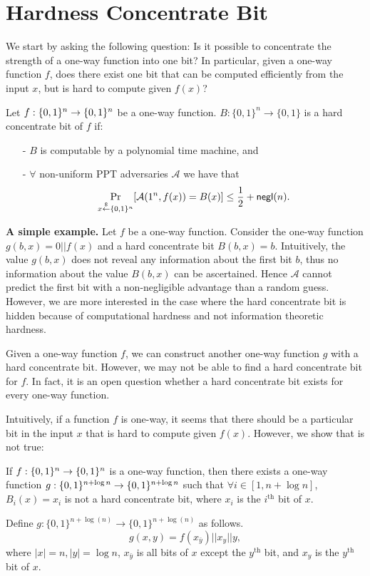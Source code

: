 \section{Hardness Concentrate Bit}
We start by asking the following question: Is it possible to concentrate the strength of a one-way function into one bit? In particular, given a one-way function $f$, does there exist one bit that can be computed efficiently from the input $x$, but is hard to compute given $f(x)$?
\begin{definition}
Let $f:\{0,1\}^{n} \rightarrow \{0,1\}^{n}$ be a one-way function.
$B:\{0,1\}^n \rightarrow \{0,1\}$ is a hard concentrate bit of $f$ if:
\begin{itemize}
\item[-] $B$ is computable by a polynomial time machine, and
\item[-] $\forall$ non-uniform PPT adversaries $\mathcal{A}$ we have that
	$$\Pr_{x\stackrel{\$}{\leftarrow} \{0,1\}^{n}}[\mathcal{A}(1^n, f(x)) = B(x)] \leq \frac{1}{2} + \mathsf{negl}(n).$$
\end{itemize}
\end{definition}

\noindent\textbf{A simple example.}
Let $f$ be a one-way function. Consider the one-way function $g(b, x) = 0 || f(x)$ and a hard concentrate bit $B(b, x) = b$.
Intuitively, the value $g(b, x)$ does not reveal any information about the first bit $b$, thus no information about the value $B(b, x)$ can be ascertained. Hence $\mathcal{A}$ cannot predict the first bit with a non-negligible advantage than a random guess. However, we are more interested in the case where the hard concentrate bit is hidden because of computational hardness and not information theoretic hardness.

\bigskip
\begin{remark}
Given a one-way function $f$, we can construct another one-way function $g$ with a hard concentrate bit. However, we may not be able to find a hard concentrate bit for $f$. In fact, it is an open question whether a hard concentrate bit exists for every one-way function.
\end{remark}

\bigskip
Intuitively, if a function $f$ is one-way, it seems that there should be a particular bit in the input $x$ that is hard to compute given $f(x)$. However, we show that is not true:
\begin{claim}
If $f:\{0,1\}^{n}\rightarrow \{0,1\}^{n}$ is a one-way function, then there exists a one-way function $g:\{0,1\}^{n+\log n}\rightarrow\{0,1\}^{n+\log n}$ such that $\forall i \in [1, n+\log n]$, $B_i(x) = x_i$ is not a hard concentrate bit, where $x_i$ is the $i^\text{th}$ bit of $x$.
\end{claim}
\proof
Define $g:\{0,1\}^{n+\log(n)} \rightarrow \{0,1\}^{n+\log(n)}$ as follows.
$$g(x,y) = f(x_{\bar y}) || x_y || y,$$
where $|x| = n, |y| = \log n$, $x_{\bar y}$ is all bits of $x$ except the $y^\text{th}$ bit, and $x_y$ is the $y^\text{th}$ bit of $x$.

